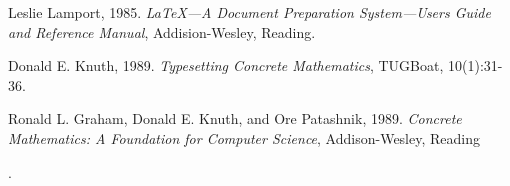 \begin{thebibliography}{3}

Leslie Lamport, 1985. \emph{\LaTeX---A Document
Preparation System---Users Guide and Reference Manual}, Addision-Wesley,
Reading.

Donald E. Knuth, 1989. \emph{Typesetting Concrete
Mathematics}, TUGBoat, 10(1):31-36.

Ronald L. Graham, Donald E. Knuth, and Ore
Patashnik, 1989. \emph{Concrete Mathematics: A Foundation for
Computer Science}, Addison-Wesley, Reading

\end{thebibliography}

























































.
